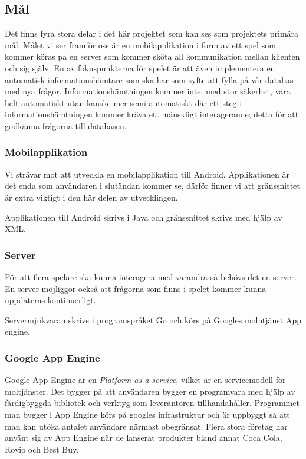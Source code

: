 \documentclass[12pt,a4paper]{article}
\begin{document}
\subsection{Mål}
Det finns fyra stora delar i det här projektet som kan ses som projektets primära mål. Målet vi ser framför oss är en mobilapplikation i form av ett spel som kommer köras på en server som kommer sköta all kommunikation mellan klienten och sig själv. En av fokuspunkterna för spelet är att även implementera en automatisk informationshämtare som ska har som syfte att fylla på vår databas med nya frågor. Informationshämtningen kommer inte, med stor säkerhet, vara helt automatiskt utan kanske mer semi-automatiskt där ett steg i informationshämtningen kommer kräva ett mänskligt interagerande; detta för att godkänna frågorna till databasen. 


\subsubsection{Mobilapplikation}
Vi strävar mot att utveckla en mobilapplikation till Android. Applikationen är det enda som användaren i slutändan kommer se, därför finner vi att gränssnittet är extra viktigt i den här delen av utvecklingen. 

Applikationen till Android skrivs i Java och gränssnittet skrivs med hjälp av XML. \cite{xml}

\subsubsection{Server}
För att flera spelare ska kunna interagera med varandra så behövs det en server. En server möjliggör också att frågorna som finns i spelet kommer kunna uppdateras kontinuerligt.

Servermjukvaran skrivs i programspråket Go \cite{golang} och körs på Googles molntjänst App engine.

\subsubsection{Google App Engine} 
Google App Engine är en \textit{Platform as a service}, vilket är en servicemodell för moltjänster. Det bygger på att användaren bygger en programvara med hjälp av färdigbyggda bibliotek och verktyg som leverantören tillhandahåller. Programmet man bygger i App Engine körs på googles infrastruktur och är uppbyggt så att man kan utöka antalet användare närmast obegränsat. Flera stora företag har använt sig av App Engine när de lanserat produkter bland annat Coca Cola, Rovio och Best Buy. \cite{googleappenginecustomers}
\end{document}
